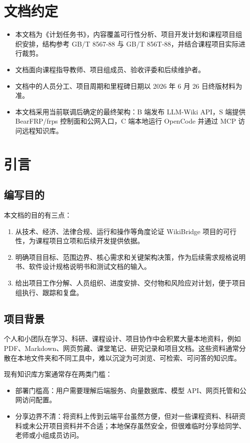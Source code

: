 \documentclass[UTF8,a4paper,12pt,fontset=fandol]{ctexart}
\begin{document}
\section*{文档约定}
\begin{itemize}
  \item 本文档为《计划任务书》，内容覆盖可行性分析、项目开发计划和课程项目组织安排，结构参考 GB/T 8567-88 与 GB/T 856T-88，并结合课程项目实际进行裁剪。
  \item 文档面向课程指导教师、项目组成员、验收评委和后续维护者。
  \item 文档中的人员分工、项目周期和里程碑日期以 2026 年 6 月 26 日终版材料为准。
  \item 本文档采用当前联调后确定的最终架构：B 端发布 LLM-Wiki API，S 端提供 BearFRP/frps 控制面和公网入口，C 端本地运行 OpenCode 并通过 MCP 访问远程知识库。
\end{itemize}

\newpage
\tableofcontents
\newpage
{}

\section{引言}

\subsection{编写目的}
本文档的目的有三点：
\begin{enumerate}
  \item 从技术、经济、法律合规、运行和操作等角度论证 WikiBridge 项目的可行性，为课程项目立项和后续开发提供依据。
  \item 明确项目目标、范围边界、核心需求和关键架构决策，作为后续需求规格说明书、软件设计规格说明书和测试文档的输入。
  \item 给出项目工作分解、人员组织、进度安排、交付物和风险应对计划，便于项目组执行、跟踪和复盘。
\end{enumerate}

\subsection{项目背景}
个人和小团队在学习、科研、课程设计、项目协作中会积累大量本地资料，例如 PDF、Markdown、网页剪藏、课堂笔记、研究记录和项目文档。这些资料通常分散在本地文件夹和不同工具中，难以沉淀为可浏览、可检索、可问答的知识库。

现有知识库方案通常存在两类门槛：
\begin{itemize}
  \item 部署门槛高：用户需要理解后端服务、向量数据库、模型 API、网页托管和公网访问配置。
  \item 分享边界不清：将资料上传到云端平台虽然方便，但对一些课程资料、科研资料或未公开项目资料并不合适；本地保存虽然安全，但很难临时分享给同学、老师或小组成员访问。
\end{itemize}
\end{document}
